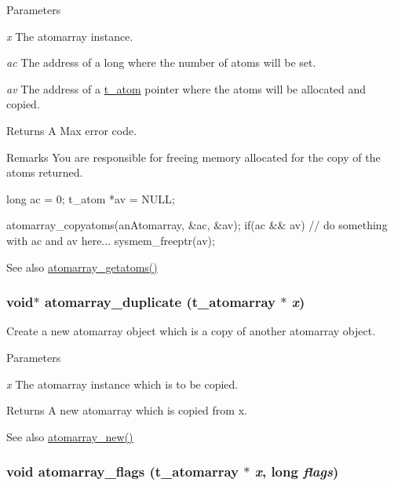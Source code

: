\begin{DoxyParams}{Parameters}
\item[{\em x}]The atomarray instance. \item[{\em ac}]The address of a long where the number of atoms will be set. \item[{\em av}]The address of a \hyperlink{structt__atom}{t\_\-atom} pointer where the atoms will be allocated and copied. \end{DoxyParams}
\begin{DoxyReturn}{Returns}
A Max error code.
\end{DoxyReturn}
\begin{DoxyRemark}{Remarks}
You are responsible for freeing memory allocated for the copy of the atoms returned. 
\begin{DoxyCode}
    long    ac = 0;
    t_atom *av = NULL;
    
    atomarray_copyatoms(anAtomarray, &ac, &av);
    if(ac && av){
        // do something with ac and av here...
        sysmem_freeptr(av);
    }   
\end{DoxyCode}

\end{DoxyRemark}
\begin{DoxySeeAlso}{See also}
\hyperlink{group__atomarray_ga28824a30f15ddaec8b1a323f285fbe85}{atomarray\_\-getatoms()} 
\end{DoxySeeAlso}
\hypertarget{group__atomarray_ga96ea96717c2ed692197361b1d02bab47}{
\subsubsection[{atomarray\_\-duplicate}]{\setlength{\rightskip}{0pt plus 5cm}void$\ast$ atomarray\_\-duplicate ({\bf t\_\-atomarray} $\ast$ {\em x})}}
\label{group__atomarray_ga96ea96717c2ed692197361b1d02bab47}


Create a new atomarray object which is a copy of another atomarray object. 
\begin{DoxyParams}{Parameters}
\item[{\em x}]The atomarray instance which is to be copied. \end{DoxyParams}
\begin{DoxyReturn}{Returns}
A new atomarray which is copied from x.
\end{DoxyReturn}
\begin{DoxySeeAlso}{See also}
\hyperlink{group__atomarray_ga2896b4949e03841f4c5a71ad7f7fadf7}{atomarray\_\-new()} 
\end{DoxySeeAlso}
\hypertarget{group__atomarray_gad99be67bb7fafb7987412ee8fc2802f0}{
\subsubsection[{atomarray\_\-flags}]{\setlength{\rightskip}{0pt plus 5cm}void atomarray\_\-flags ({\bf t\_\-atomarray} $\ast$ {\em x}, \/  long {\em flags})}}
\label{group__atomarray_gad99be67bb7fafb7987412ee8fc2802f0}



